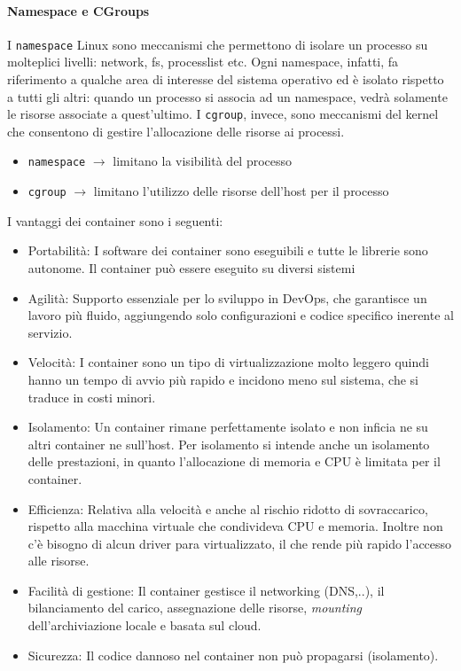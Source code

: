 \documentclass{article}
\begin{document}
		\paragraph{Namespace e CGroups}
		I \verb|namespace| Linux sono meccanismi che permettono di isolare un processo su molteplici livelli: network, fs, processlist etc.
		Ogni namespace, infatti, fa riferimento a qualche area di interesse del sistema operativo
		ed è isolato rispetto a tutti gli altri: quando un processo si associa ad un namespace, vedrà solamente le risorse associate a quest’ultimo.
		I \verb|cgroup|, invece, sono meccanismi del kernel che consentono di gestire l'allocazione delle risorse ai processi.
		\begin{itemize}
			\item \verb*|namespace| $\rightarrow$ limitano la visibilità del processo
			\item \verb*|cgroup| $\rightarrow$ limitano l'utilizzo delle risorse dell'host per il processo
		\end{itemize} 
		I vantaggi dei container sono i seguenti:
		\begin{itemize}
		    \item Portabilità: I software dei container sono eseguibili e tutte le librerie sono autonome. Il container può essere eseguito su diversi sistemi
		    \item Agilità: Supporto essenziale per lo sviluppo in DevOps, che garantisce un lavoro più fluido, aggiungendo solo configurazioni e codice specifico inerente al servizio.
		    \item Velocità: I container sono un tipo di virtualizzazione molto leggero quindi hanno un tempo di avvio più rapido e incidono meno sul sistema, che si traduce in costi minori.
		    \item Isolamento: Un container rimane perfettamente isolato e non inficia ne su altri container ne sull'host. Per isolamento si intende anche un isolamento delle prestazioni, in quanto l'allocazione di memoria e CPU è limitata per il container.
		    \item Efficienza: Relativa alla velocità e anche al rischio ridotto di sovraccarico, rispetto alla macchina virtuale che condivideva CPU e memoria. Inoltre non c'è bisogno di alcun driver para virtualizzato, il che rende più rapido l'accesso alle risorse.
		    \item Facilità di gestione: Il container gestisce il networking (DNS,..), il bilanciamento del carico, assegnazione delle risorse, \textit{mounting} dell'archiviazione locale e basata sul cloud.
		    \item Sicurezza: Il codice dannoso nel container non può propagarsi (isolamento).
		\end{itemize}
	
\end{document}
